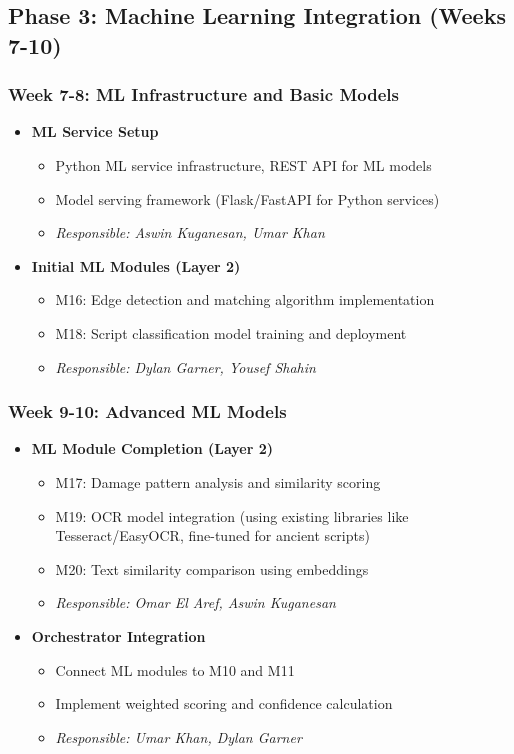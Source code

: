 \documentclass[12pt, titlepage]{article}
\begin{document}
\subsection{Phase 3: Machine Learning Integration (Weeks 7-10)}

\subsubsection{Week 7-8: ML Infrastructure and Basic Models}
\begin{itemize}
    \item \textbf{ML Service Setup}
    \begin{itemize}
        \item Python ML service infrastructure, REST API for ML models
        \item Model serving framework (Flask/FastAPI for Python services)
        \item \textit{Responsible: Aswin Kuganesan, Umar Khan}
    \end{itemize}
    \item \textbf{Initial ML Modules (Layer 2)}
    \begin{itemize}
        \item M16: Edge detection and matching algorithm implementation
        \item M18: Script classification model training and deployment
        \item \textit{Responsible: Dylan Garner, Yousef Shahin}
    \end{itemize}
\end{itemize}

\subsubsection{Week 9-10: Advanced ML Models}
\begin{itemize}
    \item \textbf{ML Module Completion (Layer 2)}
    \begin{itemize}
        \item M17: Damage pattern analysis and similarity scoring
        \item M19: OCR model integration (using existing libraries like Tesseract/EasyOCR, fine-tuned for ancient scripts)
        \item M20: Text similarity comparison using embeddings
        \item \textit{Responsible: Omar El Aref, Aswin Kuganesan}
    \end{itemize}
    \item \textbf{Orchestrator Integration}
    \begin{itemize}
        \item Connect ML modules to M10 and M11
        \item Implement weighted scoring and confidence calculation
        \item \textit{Responsible: Umar Khan, Dylan Garner}
    \end{itemize}
\end{itemize}
\end{document}

